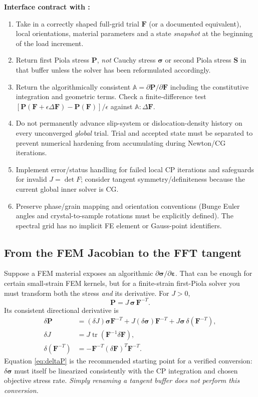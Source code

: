 \documentclass[11pt,a4paper]{article}
\newcommand{\mb}[1]{\boldsymbol{#1}}
\newcommand{\code}[1]{\texttt{\detokenize{#1}}}
\begin{document}
\textbf{Interface contract with \code{FFTMechanics}:}
\begin{enumerate}
\item Take in a correctly shaped full-grid trial $\mathbf F$ (or a documented equivalent), local orientations, material parameters and a state \emph{snapshot} at the beginning of the load increment.
\item Return first Piola stress $\mathbf P$, \emph{not} Cauchy stress $\mb\sigma$ or second Piola stress $\mathbf S$ in that buffer unless the solver has been reformulated accordingly.
\item Return the algorithmically consistent $\mathbb A=\partial\mathbf P/\partial\mathbf F$ including the constitutive integration and geometric terms. Check a finite-difference test $[\mathbf P(\mathbf F+\epsilon\Delta\mathbf F)-\mathbf P(\mathbf F)]/\epsilon$ against $\mathbb A:\Delta\mathbf F$.
\item Do not permanently advance slip-system or dislocation-density history on every unconverged \emph{global} trial. Trial and accepted state must be separated to prevent numerical hardening from accumulating during Newton/CG iterations.
\item Implement error/status handling for failed local CP iterations and safeguards for invalid $J=\det F$; consider tangent symmetry/definiteness because the current global inner solver is CG.
\item Preserve phase/grain mapping and orientation conventions (Bunge Euler angles and crystal-to-sample rotations must be explicitly defined). The spectral grid has no implicit FE element or Gauss-point identifiers.
\end{enumerate}

\subsection{From the FEM Jacobian to the FFT tangent}
Suppose a FEM material exposes an algorithmic $\partial\mb\sigma/\partial\mb\varepsilon$. That can be enough for certain small-strain FEM kernels, but for a finite-strain first-Piola solver you must transform both the stress \emph{and} its derivative. For $J>0$,
\begin{equation}
\mathbf P=J\,\mb\sigma\,\mathbf F^{-T}.
\end{equation}
Its consistent directional derivative is
\begin{align}
\delta\mathbf P &= (\delta J)\mb\sigma\mathbf F^{-T}
   +J(\delta\mb\sigma)\mathbf F^{-T}
   +J\mb\sigma\,\delta(\mathbf F^{-T}),\label{eq:deltaP}\\
\delta J &= J\operatorname{tr}(\mathbf F^{-1}\delta\mathbf F),\\
\delta(\mathbf F^{-T}) &= -\mathbf F^{-T}(\delta\mathbf F)^T\mathbf F^{-T}.
\end{align}
Equation \eqref{eq:deltaP} is the recommended starting point for a verified conversion: $\delta\mb\sigma$ must itself be linearized consistently with the CP integration and chosen objective stress rate. \emph{Simply renaming a tangent buffer does not perform this conversion.}
\end{document}
